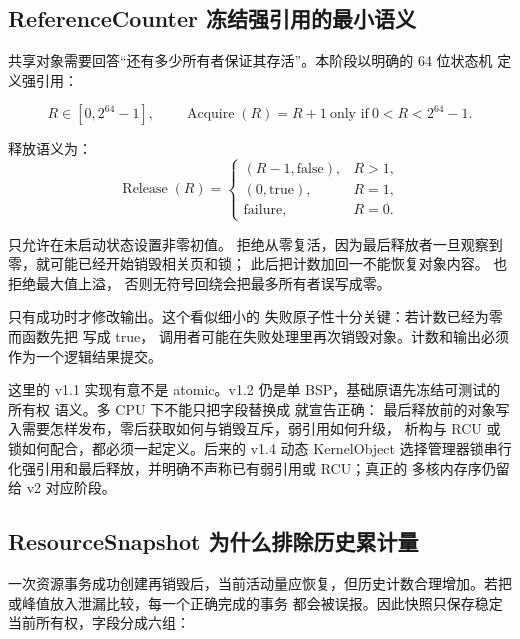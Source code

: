 \subsection{ReferenceCounter 冻结强引用的最小语义}

共享对象需要回答“还有多少所有者保证其存活”。本阶段以明确的 64 位状态机
定义强引用：

\[
R\in[0,2^{64}-1],\qquad
\operatorname{Acquire}(R)=R+1\ \text{only if}\ 0<R<2^{64}-1.
\]

释放语义为：
\[
\operatorname{Release}(R)=
\begin{cases}
(R-1,\mathrm{false}), & R>1,\\
(0,\mathrm{true}), & R=1,\\
\mathrm{failure}, & R=0.
\end{cases}
\]

 只允许在未启动状态设置非零初值。
拒绝从零复活，因为最后释放者一旦观察到零，就可能已经开始销毁相关页和锁；
此后把计数加回一不能恢复对象内容。 也拒绝最大值上溢，
否则无符号回绕会把最多所有者误写成零。

 只有成功时才修改输出。这个看似细小的
失败原子性十分关键：若计数已经为零而函数先把  写成 true，
调用者可能在失败处理里再次销毁对象。计数和输出必须作为一个逻辑结果提交。

这里的 v1.1 实现有意不是 atomic。v1.2 仍是单 BSP，基础原语先冻结可测试的所有权
语义。多 CPU 下不能只把字段替换成  就宣告正确：
最后释放前的对象写入需要怎样发布，零后获取如何与销毁互斥，弱引用如何升级，
析构与 RCU 或锁如何配合，都必须一起定义。后来的 v1.4 动态 KernelObject
选择管理器锁串行化强引用和最后释放，并明确不声称已有弱引用或 RCU；真正的
多核内存序仍留给 v2 对应阶段。

\subsection{ResourceSnapshot 为什么排除历史累计量}

一次资源事务成功创建再销毁后，当前活动量应恢复，但历史计数合理增加。若把
 或峰值放入泄漏比较，每一个正确完成的事务
都会被误报。因此快照只保存稳定当前所有权，字段分成六组：

